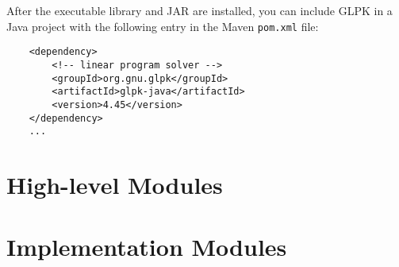 \documentclass{article}
\begin{document}
After the executable library and JAR are installed, you can include GLPK in a Java project with the following entry in the Maven \verb+pom.xml+ file:

\begin{verbatim}
    <dependency>
        <!-- linear program solver -->
        <groupId>org.gnu.glpk</groupId>
        <artifactId>glpk-java</artifactId>
        <version>4.45</version>
    </dependency>
    ...
\end{verbatim}

\section*{High-level Modules}

\section*{Implementation Modules}
\end{document}
